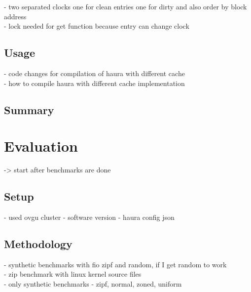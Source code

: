 \documentclass[
	12pt,
	a4paper,
	abstract,
	bibliography=totoc,
	chapterprefix,
	headings=openright,
	numbers=endperiod,
	parskip=half,
	twoside,
]{scrreprt}
\begin{document}
- two separated clocks one for clean entries one for dirty and also order by block address \\
- lock needed for get function because entry can change clock

\section{Usage}
- code changes for compilation of haura with different cache\\
- how to compile haura with different cache implementation \\

\section{Summary}

\chapter{Evaluation}
\label{cha:evaluation}



-> start after benchmarks are done

\section{Setup}

- used ovgu cluster
- software version 
- haura config json


\section{Methodology}
- synthetic benchmarks with fio zipf and random, if I get random to work\\
- zip benchmark with linux kernel source files\\
- only synthetic benchmarks 
- zipf, normal, zoned, uniform 
\end{document}
